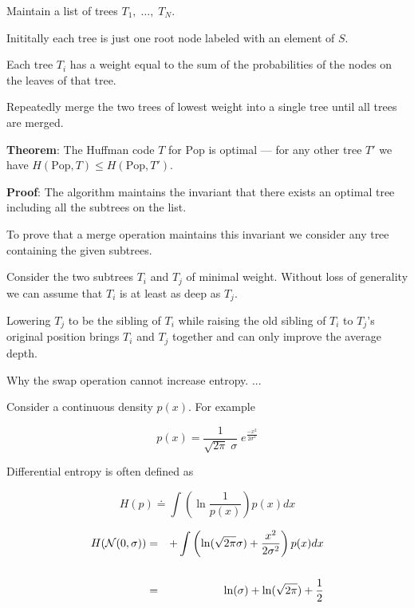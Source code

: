 {

Maintain a list of trees $T_1,\;\dots,\;T_N$.

\vfill
Inititally each tree is just one root node labeled with an element of $S$.

\vfill
Each tree $T_i$ has a weight equal to the sum of the probabilities of the nodes on the leaves of that tree.

\vfill
Repeatedly merge the two trees of lowest weight into a single tree until all trees are merged.


{\bf Theorem}: The Huffman code $T$ for $\mathrm{Pop}$ is optimal --- for any other tree $T'$ we have $H(\mathrm{Pop},T) \leq H(\mathrm{Pop},T')$.

\vfill
{\bf Proof}: The algorithm maintains the invariant that there exists an optimal tree including
all the subtrees on the list.

\vfill
To prove that a merge operation maintains this invariant we consider any tree containing the given subtrees.

\vfill
Consider the two subtrees $T_i$ and $T_j$ of minimal weight.  Without loss of generality we can assume that $T_i$ is at least as deep as $T_j$.

\vfill
Lowering $T_j$ to be the sibling of $T_i$ while raising the old sibling of $T_i$ to $T_j$'s original position
brings $T_i$ and $T_j$ together and can only improve the average depth.


Why the swap operation cannot increase entropy. ...



Consider a continuous density $p(x)$.  For example

\vfill
$$p(x) = \frac{1}{\sqrt{2\pi}\; \sigma}\; e^{\frac{-x^2}{2\sigma^2}}$$

\vfill
Differential entropy is often defined as

\vfill
$$H(p) \doteq \int \left(\ln \frac{1}{p(x)}\right) p(x) dx$$



\begin{eqnarray*}
  H({\cal N}(0,\sigma)) & = &  + \int \left( \ln(\sqrt{2\pi} \sigma) + \frac{x^2}{2\sigma^2}\right) p(x) dx \\
  \\
  & = & \ln(\sigma) + \ln(\sqrt{2\pi}) + \frac{1}{2}
\end{eqnarray*}

}
